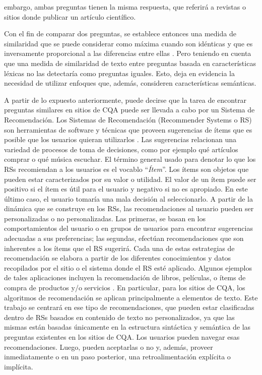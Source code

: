 embargo, ambas preguntas tienen la misma respuesta, que referirá a revistas o sitios donde publicar un artículo científico.

\bigskip Con el fin de comparar dos preguntas, se establece entonces una medida de similaridad que se puede considerar como máxima cuando son idénticas y que es inversamente proporcional a las diferencias entre ellas \citep{lin1998information}. Pero teniendo en cuenta que una medida de similaridad de texto entre preguntas basada en características léxicas no las detectaría como preguntas iguales. Esto, deja en evidencia la necesidad de utilizar enfoques que, además, consideren características semánticas.

\bigskip A partir de lo expuesto anteriormente, puede decirse que la tarea de encontrar preguntas similares en sitios de CQA puede ser llevada a cabo por un Sistema de Recomendación. Los Sistemas de Recomendación (Recommender Systems o RS) son herramientas de software y técnicas que proveen sugerencias de ítems que es posible que los usuarios quieran utilizarlos \citep{ricci2011introduction}. Las sugerencias relacionan una variedad de procesos de toma de decisiones, como por ejemplo qué artículos comprar o qué música escuchar. El término general usado para denotar lo que los RSs recomiendan a los usuarios es el vocablo “\textit{Ítem}”. Los ítems son objetos que pueden estar caracterizados por su valor o utilidad. El valor de un ítem puede ser positivo si el ítem es útil para el usuario y negativo si no es apropiado. En este último caso, el usuario tomaría una mala decisión al seleccionarlo. A partir de la dinámica que se construye en los RSs, las recomendaciones al usuario pueden ser personalizadas o no personalizadas. Las primeras, se basan en los comportamientos del usuario o en grupos de usuarios para encontrar sugerencias adecuadas a sus preferencias; las segundas, efectúan recomendaciones que son inherentes a los ítems que el RS sugerirá. Cada una de estas estrategias de recomendación se elabora a partir de los diferentes conocimientos y datos recopilados por el sitio o el sistema donde el RS esté aplicado. Algunos ejemplos de tales aplicaciones incluyen la recomendación de libros, películas, o ítems de compra de productos y/o servicios \citep{adomavicius2005toward}. En particular, para los sitios de CQA, los algoritmos de recomendación se aplican principalmente a elementos de texto. Este trabajo se centrará en ese tipo de recomendaciones, que pueden estar clasificadas dentro de RSs basados en contenido de texto no personalizados, ya que las mismas están basadas únicamente en la estructura sintáctica y semántica de las preguntas existentes en los sitios de CQA. Los usuarios pueden navegar esas recomendaciones. Luego, pueden aceptarlas o no y, además, proveer inmediatamente o en un paso posterior, una retroalimentación explícita o implícita.

